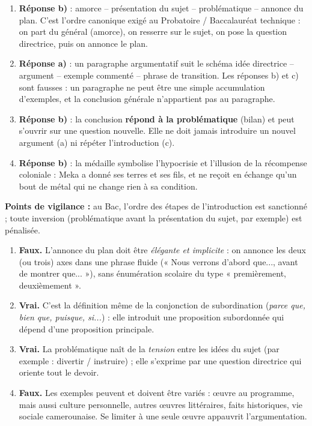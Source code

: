 \documentclass[11pt]{article}
\newcommand{\cle}[1]{{\popxbold\color{popdark}#1}}
\begin{document}
\begin{corrige}
\begin{enumerate}
\item \textbf{Réponse b)} : amorce -- présentation du sujet -- problématique -- annonce du plan. C'est l'ordre canonique exigé au Probatoire / Baccalauréat technique : on part du général (amorce), on resserre sur le sujet, on pose la question directrice, puis on annonce le plan.
\item \textbf{Réponse a)} : un paragraphe argumentatif suit le schéma \cle{idée directrice} -- \cle{argument} -- \cle{exemple} commenté -- phrase de transition. Les réponses b) et c) sont fausses : un paragraphe ne peut être une simple accumulation d'exemples, et la conclusion générale n'appartient pas au paragraphe.
\item \textbf{Réponse b)} : la conclusion \textbf{répond à la problématique} (bilan) et peut s'ouvrir sur une question nouvelle. Elle ne doit jamais introduire un nouvel argument (a) ni répéter l'introduction (c).
\item \textbf{Réponse b)} : la médaille symbolise l'\cle{hypocrisie} et l'illusion de la récompense coloniale : Meka a donné ses terres et ses fils, et ne reçoit en échange qu'un bout de métal qui ne change rien à sa condition.
\end{enumerate}
\textbf{Points de vigilance :} au Bac, l'ordre des étapes de l'introduction est sanctionné ; toute inversion (problématique avant la présentation du sujet, par exemple) est pénalisée.
\end{corrige}

\begin{corrige}
\begin{enumerate}
\item \textbf{Faux.} L'annonce du plan doit être \emph{élégante et implicite} : on annonce les deux (ou trois) axes dans une phrase fluide (« Nous verrons d'abord que..., avant de montrer que... »), sans énumération scolaire du type « premièrement, deuxièmement ».
\item \textbf{Vrai.} C'est la définition même de la conjonction de subordination (\emph{parce que, bien que, puisque, si...}) : elle introduit une proposition subordonnée qui dépend d'une proposition principale.
\item \textbf{Vrai.} La problématique naît de la \emph{tension} entre les idées du sujet (par exemple : divertir / instruire) ; elle s'exprime par une question directrice qui oriente tout le devoir.
\item \textbf{Faux.} Les exemples peuvent et doivent être variés : œuvre au programme, mais aussi culture personnelle, autres œuvres littéraires, faits historiques, vie sociale camerounaise. Se limiter à une seule œuvre appauvrit l'argumentation.
\end{enumerate}
\end{corrige}
\end{document}
